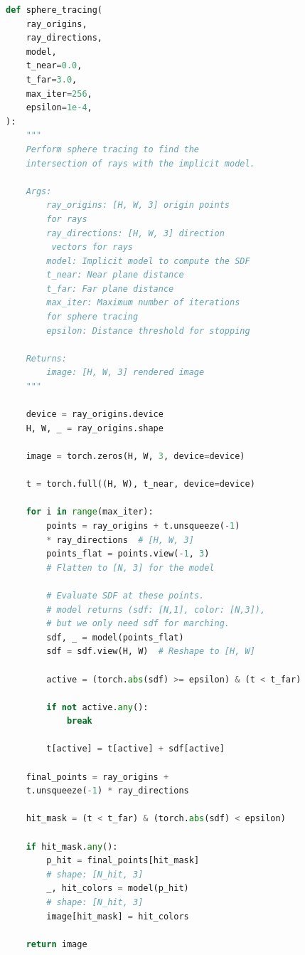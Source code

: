 \documentclass[12pt]{article}
\begin{document}
\begin{lstlisting}[language=python]
def sphere_tracing(
    ray_origins,
    ray_directions,
    model,
    t_near=0.0,
    t_far=3.0,
    max_iter=256,
    epsilon=1e-4,
):
    """
    Perform sphere tracing to find the 
    intersection of rays with the implicit model.

    Args:
        ray_origins: [H, W, 3] origin points 
        for rays
        ray_directions: [H, W, 3] direction
         vectors for rays
        model: Implicit model to compute the SDF
        t_near: Near plane distance
        t_far: Far plane distance
        max_iter: Maximum number of iterations 
        for sphere tracing
        epsilon: Distance threshold for stopping

    Returns:
        image: [H, W, 3] rendered image
    """

    device = ray_origins.device
    H, W, _ = ray_origins.shape

    image = torch.zeros(H, W, 3, device=device)
    
    t = torch.full((H, W), t_near, device=device)

    for i in range(max_iter):
        points = ray_origins + t.unsqueeze(-1) 
        * ray_directions  # [H, W, 3]
        points_flat = points.view(-1, 3)  
        # Flatten to [N, 3] for the model
        
        # Evaluate SDF at these points.
        # model returns (sdf: [N,1], color: [N,3]),
        # but we only need sdf for marching.
        sdf, _ = model(points_flat)
        sdf = sdf.view(H, W)  # Reshape to [H, W]
        
        active = (torch.abs(sdf) >= epsilon) & (t < t_far)
        
        if not active.any():
            break
        
        t[active] = t[active] + sdf[active]
    
    final_points = ray_origins + 
    t.unsqueeze(-1) * ray_directions

    hit_mask = (t < t_far) & (torch.abs(sdf) < epsilon)

    if hit_mask.any():
        p_hit = final_points[hit_mask]  
        # shape: [N_hit, 3]
        _, hit_colors = model(p_hit)  
        # shape: [N_hit, 3]
        image[hit_mask] = hit_colors

    return image
    
\end{lstlisting}
\end{document}
